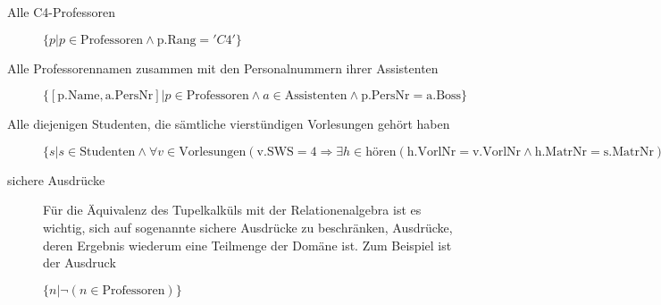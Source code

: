 \documentclass{lehramt-informatik-haupt}
\begin{document}
\begin{description}
\item[Alle C4-Professoren]
$\{p | p \in \text{Professoren} \land \text{p.Rang} = 'C4'\}$

\item[Alle Professorennamen zusammen mit den Personalnummern ihrer
Assistenten]

$\{[\text{p.Name}, \text{a.PersNr}] | p \in \text{Professoren} \land
a \in \text{Assistenten} \land \text{p.PersNr} = \text{a.Boss}\}$

\item[Alle diejenigen Studenten, die sämtliche vierstündigen Vorlesungen
gehört haben]

$\{s | s \in \text{Studenten} \land \forall
v \in \text{Vorlesungen}(\text{v.SWS} = 4 \Rightarrow
\exists h \in \text{hören}(\text{h.VorlNr} = \text{v.VorlNr} \land
\text{h.MatrNr} = \text{s.MatrNr}))\}$

\item[sichere Ausdrücke]

Für die Äquivalenz des Tupelkalküls mit der Relationenalgebra ist es
wichtig, sich auf sogenannte sichere Ausdrücke zu beschränken, \dh
Ausdrücke, deren Ergebnis wiederum eine Teilmenge der Domäne ist. Zum
Beispiel ist der Ausdruck

$\{n | \neg (n \in \text{Professoren})\}$

\end{description}

\literatur
\end{document}
